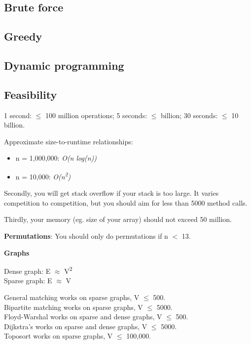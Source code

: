 
\subsection*{Brute force}

\subsection*{Greedy}

\subsection*{Dynamic programming}

\subsection*{Feasibility}

1 second: $\leq$ 100 million operations; 5 seconds: $\leq$ billion; 30 seconds: $\leq$ 10 billion.

Approximate size-to-runtime relationships:
\begin{itemize}
    \item n = 1,000,000: \textit{O(n log(n))}
    \item n = 10,000: \textit{O(n\textsuperscript{2})}
\end{itemize}

Secondly, you will get stack overflow if your stack is too large. It varies competition to competition, but you should aim for less than 5000 method calls.

Thirdly, your memory (eg. size of your array) should not exceed 50 million.

\textbf{Permutations}: You should only do permutations if n $<$ 13.

\textbf{Graphs}

Dense graph: E $\approx$ V\textsuperscript{2} \\
Sparse graph: E $\approx$ V

General matching works on sparse graphs, V $\leq$ 500. \\
Bipartite matching works on sparse graphs, V $\leq$ 5000. \\
Floyd-Warshal works on sparse and dense graphs, V $\leq$ 500. \\
Dijkstra’s works on sparse and dense graphs, V $\leq$ 5000. \\
Toposort works on sparse graphs, V $\leq$ 100,000.

